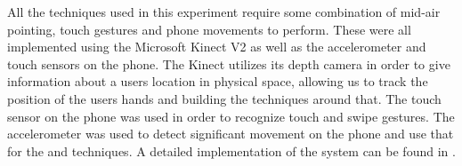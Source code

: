 All the techniques used in this experiment require some combination of mid-air pointing, touch gestures and phone movements to perform. 
These were all implemented using the Microsoft Kinect V2 as well as the accelerometer and touch sensors on the phone. 
The Kinect utilizes its depth camera in order to give information about a users location in physical space, allowing us to track the position of the users hands and building the techniques around that. 
The touch sensor on the phone was used in order to recognize touch and swipe gestures.
The accelerometer was used to detect significant movement on the phone and use that for the \tilt and \throw techniques. 
A detailed implementation of the system can be found in \cite{9thSemester:2015}.
